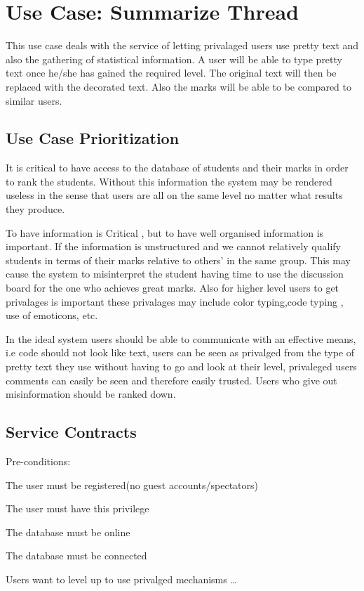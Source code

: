 \documentclass[a4paper,12pt]{article}
\begin{document}
\section{Use Case: Summarize Thread}
This use case deals with the service of letting privalaged users use pretty text and also the gathering of statistical information. A user will be able to type pretty text once he/she has gained the required level. The original text will then be replaced with the decorated text. Also the marks will be able to be compared to similar users.
    
    
\subsection{Use Case Prioritization}
It is critical to have access to the database of students and their marks in order to rank the students. Without this information the system may be rendered useless in the sense that users are all on the same level no matter what results they produce.\par

To have information is Critical , but to have well organised information is important. If the information is unstructured and we cannot relatively qualify students in terms of their marks relative to others' in the same group. This may cause the system to misinterpret the student having time to use the discussion board for the one who achieves great marks. Also for higher level users to get privalages is important these privalages may include color typing,code typing , use of emoticons, etc.\par

In the ideal system users should be able to communicate with an effective means, i.e code should not look like text, users can be seen as privalged from the type of pretty text they use without having to go and look at their level, privaleged users comments can easily be seen and therefore easily trusted. Users who give out misinformation should be ranked down.\par

      
\subsection{Service Contracts}
Pre-conditions: 
\begin{list_type}

\item The user must be registered(no guest accounts/spectators)
\item The user must have this privilege
\item The database must be online
\item The database must be connected
\item Users want to level up to use privalged mechanisms \ldots

\end{list_type}
      
\end{document}
